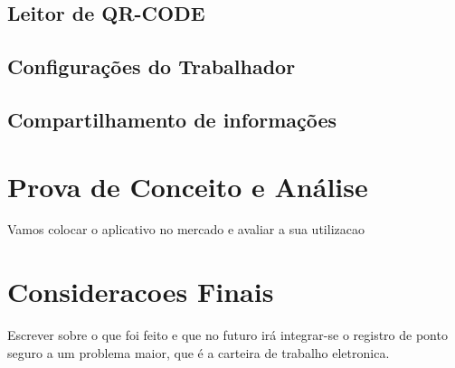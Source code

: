 \documentclass[12pt,openright,twoside,a4paper,english, brazil]{abntex2} %
\begin{document}
\section{Leitor de QR-CODE}

\section{Configurações do Trabalhador}

\section{Compartilhamento de informações}





\chapter{Prova de Conceito e Análise}

Vamos colocar o aplicativo no mercado e avaliar a sua utilizacao





\chapter{Consideracoes Finais}

Escrever sobre o que foi feito e que no futuro irá integrar-se o registro de ponto seguro a um problema maior, que é a carteira de trabalho eletronica.




\apendices
\end{document}
